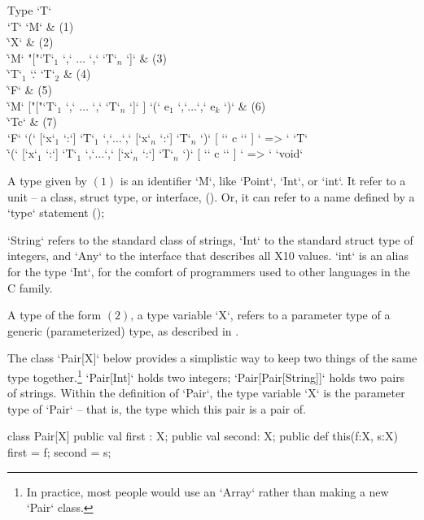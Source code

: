 \begin{bbgrammar}
Type \: \xcd`T` \\
\xcd`T` \: \xcd`M`  & (1)\\
  \| \xcd`X` & (2) \\
  \| \xcd`M` \xcd"["\xcd`T`$_1$ \xcd`,` $\ldots$ \xcd`,` \xcd`T`$_n$ \xcd`]` & (3)\\
  \| \xcd`T`$_1$  \xcd`.` \xcd`T`$_2$ & (4)\\
  \| \xcd`F` & (5)\\
  \| \xcd`M` [\xcd"["\xcd`T`$_1$ \xcd`,` $\ldots$ \xcd`,` \xcd`T`$_n$ \xcd`]` ]
       \xcd`(` e$_1$ \xcd`,`$\ldots$\xcd`,` e$_k$ \xcd`)` & (6) \\
  \| \xcd`T{c}` & (7) \\
\xcd`F` \: \xcd`(` [\xcd`x`$_1$ \xcd`:`] \xcd`T`$_1$ \xcd`,`$\ldots$\xcd`,`
             [\xcd`x`$_n$ \xcd`:`] \xcd`T`$_n$ \xcd`)` [ \xcd`{` c  \xcd`}` ] \xcd` => ` \xcd`T` \\
  \| \xcd`(` [\xcd`x`$_1$ \xcd`:`] \xcd`T`$_1$ \xcd`,`$\ldots$\xcd`,`
             [\xcd`x`$_n$ \xcd`:`] \xcd`T`$_n$ \xcd`)` [ \xcd`{` c  \xcd`}` ] \xcd` => ` \xcd`void` \\

\end{bbgrammar}


A type given by $(1)$ is an identifier \xcd`M`, like \xcd`Point`, \xcd`Int`, or
\xcd`int`.  It refer to a unit -- a class, struct type, or interface, 
().  
Or, it can refer to a name defined by a \xcd`type` statement
(); 

\begin{ex}
\xcd`String` refers to the standard class
of strings, \xcd`Int` to the standard struct type of integers, 
and \xcd`Any` to the interface that describes
all X10 values.  
\xcd`int` is an alias for the type \xcd`Int`, for the
comfort of programmers used to other languages in the C family. 
\end{ex}


A type of the form $(2)$, a type variable \xcd`X`, refers to a parameter type
of a generic (parameterized) type, as described in .

\begin{ex}
The class \xcd`Pair[X]` below provides a simplistic way to keep two things of
the same type together.\footnote{In practice, most people would use an
\xcd`Array` rather than making a new \xcd`Pair` class.}  \xcd`Pair[Int]` holds
two integers; 
\xcd`Pair[Pair[String]]` holds two pairs of strings.  Within the definition of
\xcd`Pair`, the type variable \xcd`X` is the parameter type of \xcd`Pair` --
that is, the type which this pair is a pair of.   
\begin{xten}
class Pair[X]{
  public val first : X; 
  public val second: X;
  public def this(f:X, s:X) {first = f; second = s;}
}
\end{xten}
%
\end{ex}



